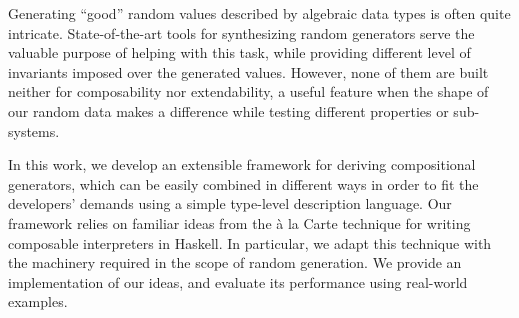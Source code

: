 Generating ``good'' random values described by algebraic data types is often
quite intricate.
%
State-of-the-art tools for synthesizing random generators serve the valuable
purpose of helping with this task, while providing different level of invariants
imposed over the generated values.
%
However, none of them are built neither for composability nor extendability, a
useful feature when the shape of our random data makes a difference while
testing different properties or sub-systems.
%


In this work, we develop an extensible framework for deriving compositional
generators, which can be easily combined in different ways in order to fit the
developers' demands using a simple type-level description language.
%
Our framework relies on familiar ideas from the \`a la Carte technique for
writing composable interpreters in Haskell.
%
In particular, we adapt this technique with the machinery required in the scope
of random generation.
%
We provide an implementation of our ideas, and evaluate its performance using
real-world examples.
%